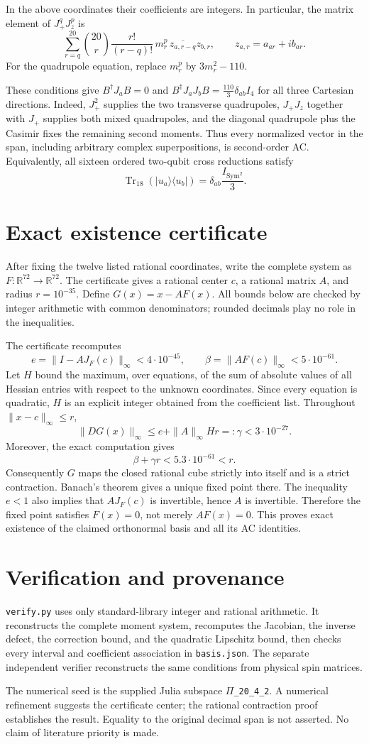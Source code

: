 \documentclass[11pt]{article}
\begin{document}
In the above coordinates their coefficients are integers.  In particular,
the matrix element of $J_+^qJ_z^p$ is
\[
\sum_{r=q}^{20}\binom{20}{r}\frac{r!}{(r-q)!}\,m_r^p\,
\overline{z_{a,r-q}}z_{b,r},\qquad z_{a,r}=a_{ar}+ib_{ar}.
\]
For the quadrupole equation, replace $m_r^p$ by $3m_r^2-110$.

These conditions give $B^\dagger J_a B=0$ and
$B^\dagger J_aJ_b B=\frac{110}{3}\delta_{ab}I_4$ for all three
Cartesian directions.  Indeed, $J_+^2$ supplies the two transverse
quadrupoles, $J_+J_z$ together with $J_+$ supplies both mixed
quadrupoles, and the diagonal quadrupole plus the Casimir fixes the
remaining second moments.  Thus every normalized vector in the span,
including arbitrary complex superpositions, is second-order AC.
Equivalently, all sixteen ordered two-qubit cross reductions satisfy
\[
\operatorname{Tr}_{18}(|u_a\rangle\langle u_b|)
=\delta_{ab}\frac{I_{\mathrm{Sym}^2}}{3}.
\]

\section{Exact existence certificate}
After fixing the twelve listed rational coordinates, write the complete
system as $F:\mathbb R^{72}\to\mathbb R^{72}$.  The certificate gives
a rational center $c$, a rational matrix $A$, and radius
$r=10^{-35}$.  Define $G(x)=x-AF(x)$.  All bounds below are checked by
integer arithmetic with common denominators; rounded decimals play no
role in the inequalities.

The certificate recomputes
\[
e=\|I-AJ_F(c)\|_\infty<4\cdot10^{-45},\qquad
\beta=\|AF(c)\|_\infty<5\cdot10^{-61}.
\]
Let $H$ bound the maximum, over equations, of the sum of absolute
values of all Hessian entries with respect to the unknown coordinates.
Since every equation is quadratic, $H$ is an explicit integer obtained
from the coefficient list.  Throughout $\|x-c\|_\infty\le r$,
\[
\|DG(x)\|_\infty
\le e+\|A\|_\infty Hr=:\gamma<3\cdot10^{-27}.
\]
Moreover, the exact computation gives
\[
\beta+\gamma r<5.3\cdot10^{-61}<r.
\]
Consequently $G$ maps the closed rational cube strictly into itself and
is a strict contraction.  Banach's theorem gives a unique fixed point
there.  The inequality $e<1$ also implies that $AJ_F(c)$ is invertible,
hence $A$ is invertible.  Therefore the fixed point satisfies $F(x)=0$,
not merely $AF(x)=0$.  This proves exact existence of the claimed
orthonormal basis and all its AC identities.

\section{Verification and provenance}
\texttt{verify.py} uses only standard-library integer and rational
arithmetic.  It reconstructs the complete moment system, recomputes the
Jacobian, the inverse defect, the correction bound, and the quadratic
Lipschitz bound, then checks every interval and coefficient association
in \texttt{basis.json}.  The separate independent verifier reconstructs
the same conditions from physical spin matrices.

The numerical seed is the supplied Julia subspace
\(\Pi\)\texttt{\_20\_4\_2}.  A numerical refinement suggests the
certificate center; the rational contraction proof establishes the
result.  Equality to the original decimal span is not asserted.
No claim of literature priority is made.
\end{document}
